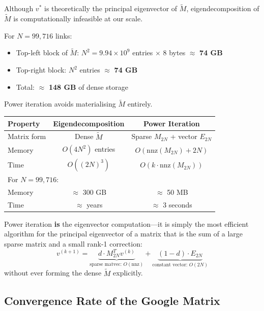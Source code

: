 \documentclass[12pt,a4paper]{article}
\theoremstyle{definition}
\theoremstyle{plain}
\begin{document}
Although $v^*$ is theoretically the principal eigenvector of $\widetilde{M}$,
eigendecomposition of $\widetilde{M}$ is computationally infeasible at our scale.

\begin{memorybox}
  For $N = 99{,}716$ links:
  \begin{itemize}
    \item Top-left block of $\widetilde{M}$: $N^2 = 9.94 \times 10^9$ entries
      $\times$ 8 bytes $\approx$ \textbf{74 GB}
    \item Top-right block: $N^2$ entries $\approx$ \textbf{74 GB}
    \item Total: $\approx$ \textbf{148 GB} of dense storage
  \end{itemize}
  Power iteration avoids materialising $\widetilde{M}$ entirely.
\end{memorybox}

\begin{center}
\renewcommand{\arraystretch}{1.3}
\begin{tabular}{lcc}
\hline
\textbf{Property} & \textbf{Eigendecomposition} & \textbf{Power Iteration} \\
\hline
Matrix form & Dense $\widetilde{M}$ & Sparse $M_{2N}$ + vector $E_{2N}$ \\
Memory       & $O(4N^2)$ entries    & $O(\text{nnz}(M_{2N}) + 2N)$ \\
Time         & $O((2N)^3)$          & $O(k \cdot \text{nnz}(M_{2N}))$ \\
\hline
\multicolumn{3}{l}{\small For $N = 99{,}716$:} \\
Memory & $\approx$ 300 GB & $\approx$ 50 MB \\
Time   & $\approx$ years  & $\approx$ 3 seconds \\
\hline
\end{tabular}
\end{center}

\begin{insight}
  Power iteration \textbf{is} the eigenvector computation---it is simply the most
  efficient algorithm for the principal eigenvector of a matrix that is the sum of a
  large sparse matrix and a small rank-1 correction:
  \[
    v^{(k+1)} =
    \underbrace{d \cdot M_{2N}^T v^{(k)}}_{\text{sparse matvec: } O(\text{nnz})}
    + \underbrace{(1-d) \cdot E_{2N}}_{\text{constant vector: } O(2N)}
  \]
  without ever forming the dense $\widetilde{M}$ explicitly.
\end{insight}

\subsection{Convergence Rate of the Google Matrix}
\label{sec:convergence_rate}
\end{document}
